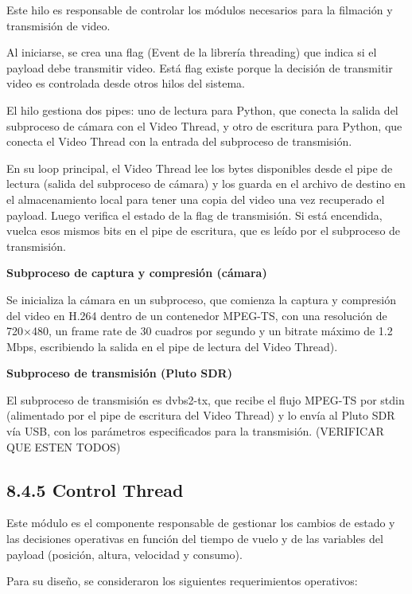 \documentclass[12pt,a4paper]{article}
\begin{document}
Este hilo es responsable de controlar los módulos necesarios para la filmación y transmisión de video.

Al iniciarse, se crea una flag (Event de la librería threading) que indica si el payload debe transmitir video. Está flag existe porque la decisión de transmitir video es controlada desde otros hilos del sistema.

El hilo gestiona dos pipes: uno de lectura para Python, que conecta la salida del subproceso de cámara con el Video Thread, y otro de escritura para Python, que conecta el Video Thread con la entrada del subproceso de transmisión.

En su loop principal, el Video Thread lee los bytes disponibles desde el pipe de lectura (salida del subproceso de cámara) y los guarda en el archivo de destino en el almacenamiento local para tener una copia del video una vez recuperado el payload. Luego verifica el estado de la flag de transmisión. Si está encendida, vuelca esos mismos bits en el pipe de escritura, que es leído por el subproceso de transmisión.

\textbf{Subproceso de captura y compresión (cámara)}

Se inicializa la cámara en un subproceso, que comienza la captura y compresión del video en H.264 dentro de un contenedor MPEG-TS, con una resolución de 720×480, un frame rate de 30 cuadros por segundo y un bitrate máximo de 1.2 Mbps, escribiendo la salida en el pipe de lectura del Video Thread).

\textbf{Subproceso de transmisión (Pluto SDR)}

El subproceso de transmisión es dvbs2-tx, que recibe el flujo MPEG-TS por stdin (alimentado por el pipe de escritura del Video Thread) y lo envía al Pluto SDR vía USB, con los parámetros especificados para la transmisión. (VERIFICAR QUE ESTEN TODOS)

\subsection{\texorpdfstring{8.4.5 Control Thread }{8.4.5 Control Thread }}\label{control-thread}

Este módulo es el componente responsable de gestionar los cambios de estado y las decisiones operativas en función del tiempo de vuelo y de las variables del payload (posición, altura, velocidad y consumo).

Para su diseño, se consideraron los siguientes requerimientos operativos:
\end{document}
